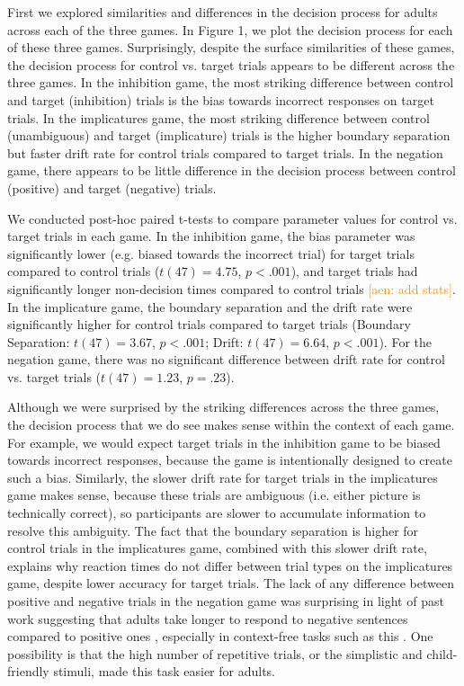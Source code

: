 \documentclass[10pt,letterpaper]{article}
\newcommand{\aen}[1]{\textcolor{DarkOrange}{[aen: #1]}}
\begin{document}
First we explored similarities and differences in the decision process for adults across each of the three games.  In Figure 1, we plot the decision process for each of these three games.  Surprisingly, despite the surface similarities of these games, the decision process for control vs. target trials appears to be different across the three games.  In the inhibition game, the most striking difference between control and target (inhibition) trials is the bias towards incorrect responses on target trials.  In the implicatures game, the most striking difference between control (unambiguous) and target (implicature) trials is the higher boundary separation but faster drift rate for control trials compared to target trials.  In the negation game, there appears to be little difference in the decision process between control (positive) and target (negative) trials.

We conducted post-hoc paired t-tests to compare parameter values for control vs. target trials in each game.  In the inhibition game, the bias parameter was significantly lower (e.g. biased towards the incorrect trial) for target trials compared to control trials ($t(47) = 4.75$, $p< .001$), and target trials had significantly longer non-decision times compared to control trials \aen{add stats}.  In the implicature game, the boundary separation and the drift rate were significantly higher for control trials compared to target trials (Boundary Separation: $t(47) = 3.67$, $p< .001$; Drift: $t(47) = 6.64$, $p< .001$).  For the negation game, there was no significant difference between drift rate for control vs. target trials ($t(47) = 1.23$, $p = .23$).  

Although we were surprised by the striking differences across the three games, the decision process that we do see makes sense within the context of each game.  For example, we would expect target trials in the inhibition game to be biased towards incorrect responses, because the game is intentionally designed to create such a bias.  Similarly, the slower drift rate for target trials in the implicatures game makes sense, because these trials are ambiguous (i.e. either picture is technically correct), so participants are slower to accumulate information to resolve this ambiguity. The fact that the boundary separation is higher for control trials in the implicatures game, combined with this slower drift rate, explains why reaction times do not differ between trial types on the implicatures game, despite lower accuracy for target trials.  The lack of any difference between positive and negative trials in the negation game was surprising in light of past work suggesting that adults take longer to respond to negative sentences compared to positive ones \cite{hclark1972}, especially in context-free tasks such as this \cite{nordmeyer2014a}.  One possibility is that the high number of repetitive trials, or the simplistic and child-friendly stimuli, made this task easier for adults.
\end{document}
